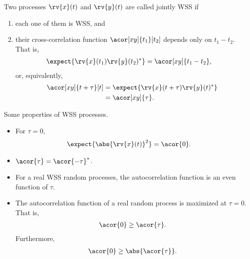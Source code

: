 \begin{definitionBox}
    Two processes $\rv{x}(t)$ and $\rv{y}(t)$ are called jointly WSS if
    \begin{enumerate}
        \item each one of them is WSS, and
        \item their cross-correlation function $\acor[xy]{t_{1}}[t_{2}]$ depends only on $t_{1}-t_{2}$. That is,
        \begin{align}
            \expect{\rv{x}(t_{1})\rv{y}(t_{2})^{\herm}} &= \acor[xy]{t_{1}-t_{2}},
        \end{align}
        or, equivalently,
        \begin{align}
            \acor[xy]{t+\tau}[t] &= \expect{\rv{x}(t+\tau)\rv{y}(t)^{\herm}}\\
            &= \acor[xy]{\tau}.
        \end{align}
    \end{enumerate}
\end{definitionBox}
\begin{remarkBox}
    Some properties of WSS processes. 
    
    \begin{itemize}
        \item For $\tau=0$,
        \begin{align}
            \expect{\abs{\rv{x}(t)}^{2}} &= \acor{0}.
        \end{align}
        \item $\acor{\tau} = \acor{-\tau}^{\herm}$.
        \item For a real WSS random processes, the autocorrelation function is an even function of $\tau$. 
        \item The autocorrelation function of a real random process is maximized at $\tau=0$. That is,
        \begin{align}
            \acor{0} \geq \acor{\tau}.
        \end{align}
        Furthermore,
        \begin{align}
            \acor{0}\geq \abs{\acor{\tau}}.
        \end{align}
    \end{itemize}
\end{remarkBox}